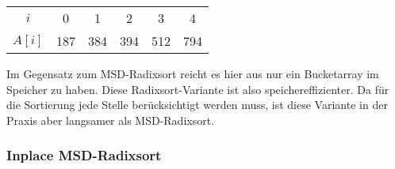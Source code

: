 \begin{table}[H]
	\centering
	\begin{tabular}{c|| c | c | c | c | c }
		$i$ & 0 & 1 & 2 & 3 & 4 \\
		$A[i]$ & 187 & 384 & 394 & 512 & 794
	\end{tabular}
	\label{tab:radix:lsd:step_3}
\end{table}

Im Gegensatz zum MSD-Radixsort reicht es hier aus nur ein Bucketarray im Speicher zu haben. Diese Radixsort-Variante ist also speichereffizienter. Da für die Sortierung jede Stelle berücksichtigt werden muss, ist diese Variante in der Praxis aber langsamer als MSD-Radixsort.

\subsubsection{Inplace MSD-Radixsort}
\label{sort:radix:inplace}

